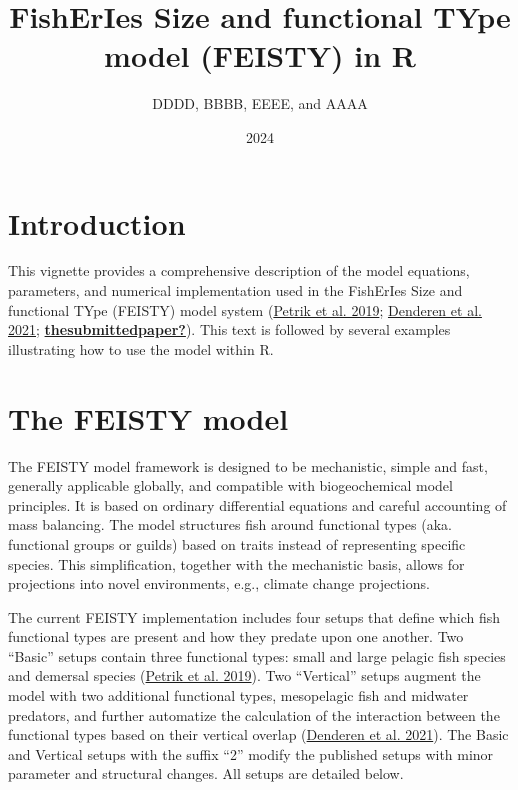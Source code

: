 \documentclass[
]{article}
\title{FishErIes Size and functional TYpe model (FEISTY) in R}
\author{DDDD, BBBB, EEEE, and AAAA}
\date{2024}
\begin{document}
\maketitle

\hypertarget{introduction}{%
\section{Introduction}\label{introduction}}

This vignette provides a comprehensive description of the model
equations, parameters, and numerical implementation used in the
FishErIes Size and functional TYpe (FEISTY) model system
(\protect\hyperlink{ref-petrik2019bottom}{Petrik et al. 2019};
\protect\hyperlink{ref-van2021emergent}{Denderen et al. 2021};
\protect\hyperlink{ref-thesubmittedpaper}{\textbf{thesubmittedpaper?}}).
This text is followed by several examples illustrating how to use the
model within R.

\hypertarget{the-feisty-model}{%
\section{The FEISTY model}\label{the-feisty-model}}

The FEISTY model framework is designed to be mechanistic, simple and
fast, generally applicable globally, and compatible with biogeochemical
model principles. It is based on ordinary differential equations and
careful accounting of mass balancing. The model structures fish around
functional types (aka. functional groups or guilds) based on traits
instead of representing specific species. This simplification, together
with the mechanistic basis, allows for projections into novel
environments, e.g., climate change projections.

The current FEISTY implementation includes four setups that define which
fish functional types are present and how they predate upon one another.
Two ``Basic'' setups contain three functional types: small and large
pelagic fish species and demersal species
(\protect\hyperlink{ref-petrik2019bottom}{Petrik et al. 2019}). Two
``Vertical'' setups augment the model with two additional functional
types, mesopelagic fish and midwater predators, and further automatize
the calculation of the interaction between the functional types based on
their vertical overlap (\protect\hyperlink{ref-van2021emergent}{Denderen
et al. 2021}). The Basic and Vertical setups with the suffix ``2''
modify the published setups with minor parameter and structural changes.
All setups are detailed below.
\end{document}
